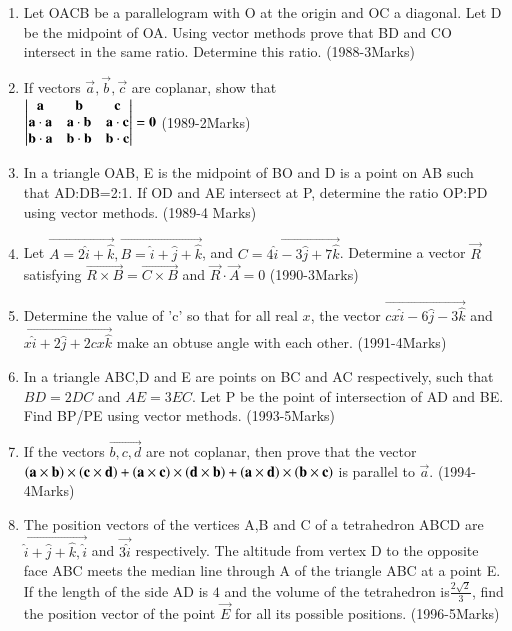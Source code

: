 \documentclass[journal,12pt,twocolumn]{IEEEtran}
\theoremstyle{remark}
\begin{document}
\begin{enumerate}
\item Let OACB be a parallelogram with O at the origin and OC a diagonal. Let D be the midpoint of OA. Using vector methods prove that BD and CO intersect in the same ratio. Determine this ratio. \hfill{(1988-3Marks)}\\ 

\item If vectors $\vec{a},\vec{b},\vec{c}$ are coplanar, show that\\
	$
		\begin{vmatrix}
\mathbf{a} & \mathbf{b} & \mathbf{c} \\
\mathbf{a}\cdot\mathbf{a} & \mathbf{a}\cdot\mathbf{b} & \mathbf{a}\cdot\mathbf{c} \\
\mathbf{b}\cdot\mathbf{a} & \mathbf{b}\cdot\mathbf{b} & \mathbf{b}\cdot\mathbf{c}
 \end{vmatrix}=\mathbf{0}
$ \hfill{(1989-2Marks)}\\

\item In a triangle OAB, E is the midpoint of BO and D is a point on AB such that AD:DB=2:1. If OD and AE intersect at P, determine the ratio OP:PD  using vector methods. \hfill{(1989-4 Marks)}\\

\item Let $\vec{A=2\hat{i}+\hat{k}},\vec{B=\hat{i}+\hat{j}+\hat{k}}$, and $\vec{C=4\hat{i}-3\hat{j}+7\hat{k}}$. Determine a vector $\vec{R}$ satisfying $\vec{R\times B}=\vec{C\times B}$ and $\vec{R}\cdot\vec{A}=0$ \hfill{(1990-3Marks)}\\

\item Determine the value of 'c' so that for all real $x$, the vector $\vec{cx\hat{i}-6\hat{j}-3\hat{k}}$ and $\vec{x\hat{i}+2\hat{j}+2cx\hat{k}}$ make an obtuse angle with each other. \hfill{(1991-4Marks)}\\

\item In a triangle ABC,D and E are points on BC and AC respectively, such that $BD=2DC$ and $AE=3EC$. Let P be the point of intersection of AD and BE. Find BP/PE using vector methods. \hfill{(1993-5Marks)}\\

\item If the vectors $\vec{b,c,d}$ are not coplanar, then prove that the vector $\mathbf{\left(a\times b\right)\times\left(c\times d\right)}+\mathbf{\left(a\times c\right)\times\left(d\times b\right)}+\mathbf{\left(a\times d\right)\times\left(b\times c\right)}$ is parallel to $\vec{a}$. \hfill{(1994-4Marks)}\\

\item The position vectors of the vertices A,B and C of a tetrahedron ABCD are $\vec{\hat{i}+\hat{j}+\hat{k},\hat{i}}$ and $\vec{3\hat{i}}$ respectively. The altitude from vertex D to the opposite face ABC meets the median line through A of the triangle ABC at a point E. If the length of the side AD is $4$ and the volume of the tetrahedron is$\frac{2\sqrt{2}}{3}$, find the position vector of the point $\vec{E}$ for all its possible positions. \hfill{(1996-5Marks)}


\end{enumerate}
\end{document}
